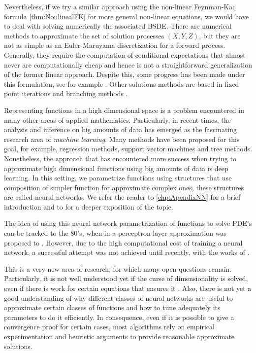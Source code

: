 Nevertheless, if we try a similar approach using the non-linear Feynman-Kac formula \ref{thm:NonlinealFK} for more general non-linear equations, we would have to deal with solving numerically the associated BSDE. There are numerical methods to approximate the set of solution processes $(X,Y,Z)$, but they are not as simple as an Euler-Maruyama discretization for a forward process. Generally, they require the computation of conditional expectations that almost never are computationally cheap and hence is not a straightforward generalization of the former linear approach. Despite this, some progress has been made under this formulation, see for example \cite{chessari_numerical_nodate}. Other solutions methods are based in fixed point iterations and branching methods \cite{bibid}.

Representing functions in a high dimensional space is a problem encountered in many other areas of applied mathematics. Particularly, in recent times, the analysis and inference on big amounts of data has emerged as the fascinating research area of \textit{machine learning}. Many methods have been proposed for this goal, for example, regression methods, support vector machines and tree methods. Nonetheless, the approach that has encountered more success when trying to approximate high dimensional functions using big amounts of data is deep learning.  In this setting, we parametrize functions using structures that use composition of simpler function for approximate complex ones, these structures are called neural networks. We refer the reader to \autoref{chp:ApendixNN} for a brief introduction and to \cite{higham_deep_2019} for a deeper exposition of the topic.

The idea of using this neural network parametrization of functions to solve PDE's can be tracked to the 80's, when in \cite{} a perceptron layer approximation was proposed to \hlc[Completar]{}. However, due to the high computational cost of training a neural network, a successful attempt was not achieved until recently, with the works of \cite{bibid}\hlc[Blablabla]{}. 

This is a very new area of research, for which many open questions remain. Particularly, it is not well understood yet if the curse of dimensionality is solved, even if there is work for certain equations that ensures it \cite{bibid}. Also, there is not yet a good understanding of why different classes of neural networks are useful to approximate certain classes of functions and how to tune adequately its parameters to do it efficiently. In consequence, even if it is possible to give a convergence proof for certain cases, most algorithms rely on empirical experimentation and heuristic arguments to provide reasonable approximate solutions.    

